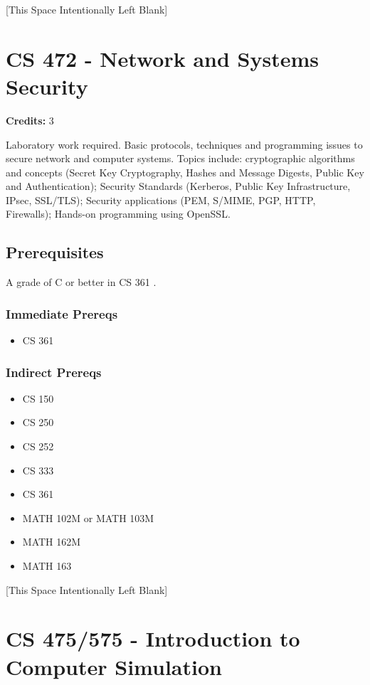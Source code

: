 \documentclass[]{article}
\providecommand{\tightlist}{%
  \setlength{\itemsep}{0pt}\setlength{\parskip}{0pt}}
\newcommand{\pagebreakhere}{
\vspace*{\fill}
\begin{center}
[This Space Intentionally Left Blank]
\end{center}
\vspace*{\fill}
\newpage
}
\begin{document}
\pagebreakhere
\section{CS 472 - Network and Systems
Security}\label{cs-472---network-and-systems-security}

\textbf{Credits:} 3

Laboratory work required. Basic protocols, techniques and programming
issues to secure network and computer systems. Topics include:
cryptographic algorithms and concepts (Secret Key Cryptography, Hashes
and Message Digests, Public Key and Authentication); Security Standards
(Kerberos, Public Key Infrastructure, IPsec, SSL/TLS); Security
applications (PEM, S/MIME, PGP, HTTP, Firewalls); Hands-on programming
using OpenSSL.

\subsection{Prerequisites}\label{prerequisites-44}

A grade of C or better in CS 361 .

\subsubsection{Immediate Prereqs}\label{immediate-prereqs-35}

\begin{itemize}
\tightlist
\item
  CS 361
\end{itemize}

\subsubsection{Indirect Prereqs}\label{indirect-prereqs-35}

\begin{itemize}
\tightlist
\item
  CS 150
\item
  CS 250
\item
  CS 252
\item
  CS 333
\item
  CS 361
\item
  MATH 102M or MATH 103M
\item
  MATH 162M
\item
  MATH 163
\end{itemize}

\pagebreakhere
\section{CS 475/575 - Introduction to Computer
Simulation}\label{cs-475575---introduction-to-computer-simulation}
\end{document}
